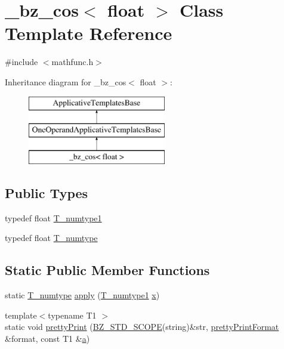 \hypertarget{class__bz__cos_3_01float_01_4}{}\section{\+\_\+bz\+\_\+cos$<$ float $>$ Class Template Reference}
\label{class__bz__cos_3_01float_01_4}


{\ttfamily \#include $<$mathfunc.\+h$>$}

Inheritance diagram for \+\_\+bz\+\_\+cos$<$ float $>$\+:\begin{figure}[H]
\begin{center}
\leavevmode
\includegraphics[height=3.000000cm]{class__bz__cos_3_01float_01_4}
\end{center}
\end{figure}
\subsection*{Public Types}
\begin{DoxyCompactItemize}
\item 
typedef float \hyperlink{class__bz__cos_3_01float_01_4_a547835caa040140d5afc07981b3bfedc}{T\+\_\+numtype1}
\item 
typedef float \hyperlink{class__bz__cos_3_01float_01_4_aedf2c5f4b8b8afd601d10d61b66c751b}{T\+\_\+numtype}
\end{DoxyCompactItemize}
\subsection*{Static Public Member Functions}
\begin{DoxyCompactItemize}
\item 
static \hyperlink{class__bz__cos_3_01float_01_4_aedf2c5f4b8b8afd601d10d61b66c751b}{T\+\_\+numtype} \hyperlink{class__bz__cos_3_01float_01_4_a0c2341184bb3612c191a7b762a8f2374}{apply} (\hyperlink{class__bz__cos_3_01float_01_4_a547835caa040140d5afc07981b3bfedc}{T\+\_\+numtype1} \hyperlink{vecnorm1_8cc_ac73eed9e41ec09d58f112f06c2d6cb63}{x})
\item 
{\footnotesize template$<$typename T1 $>$ }\\static void \hyperlink{class__bz__cos_3_01float_01_4_a4b4c5059dbcc2efa3f5cdb55cfa8f30e}{pretty\+Print} (\hyperlink{numinquire_8h_a2b24ffc3b4ef9803956bc7715c6c7b83}{B\+Z\+\_\+\+S\+T\+D\+\_\+\+S\+C\+O\+P\+E}(string)\&str, \hyperlink{classprettyPrintFormat}{pretty\+Print\+Format} \&format, const T1 \&\hyperlink{gen__mat5files_8m_aae328bf20413f220e38aec4d95bfd6da}{a})
\end{DoxyCompactItemize}


